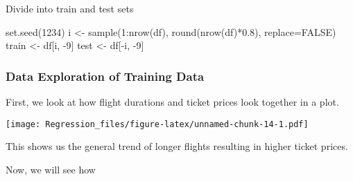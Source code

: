 \documentclass[
]{article}
\newenvironment{Shaded}{\begin{snugshade}}{\end{snugshade}}
\newcommand{\AttributeTok}[1]{\textcolor[rgb]{0.77,0.63,0.00}{#1}}
\newcommand{\ConstantTok}[1]{\textcolor[rgb]{0.00,0.00,0.00}{#1}}
\newcommand{\DecValTok}[1]{\textcolor[rgb]{0.00,0.00,0.81}{#1}}
\newcommand{\FloatTok}[1]{\textcolor[rgb]{0.00,0.00,0.81}{#1}}
\newcommand{\FunctionTok}[1]{\textcolor[rgb]{0.00,0.00,0.00}{#1}}
\newcommand{\NormalTok}[1]{#1}
\newcommand{\OtherTok}[1]{\textcolor[rgb]{0.56,0.35,0.01}{#1}}
\newcommand{\SpecialCharTok}[1]{\textcolor[rgb]{0.00,0.00,0.00}{#1}}
\newcommand{\StringTok}[1]{\textcolor[rgb]{0.31,0.60,0.02}{#1}}
\begin{document}
Divide into train and test sets

\begin{Shaded}
\begin{Highlighting}[]
\FunctionTok{set.seed}\NormalTok{(}\DecValTok{1234}\NormalTok{)}
\NormalTok{i }\OtherTok{\textless{}{-}} \FunctionTok{sample}\NormalTok{(}\DecValTok{1}\SpecialCharTok{:}\FunctionTok{nrow}\NormalTok{(df), }\FunctionTok{round}\NormalTok{(}\FunctionTok{nrow}\NormalTok{(df)}\SpecialCharTok{*}\FloatTok{0.8}\NormalTok{), }\AttributeTok{replace=}\ConstantTok{FALSE}\NormalTok{)}
\NormalTok{train }\OtherTok{\textless{}{-}}\NormalTok{ df[i, }\SpecialCharTok{{-}}\DecValTok{9}\NormalTok{]}
\NormalTok{test }\OtherTok{\textless{}{-}}\NormalTok{ df[}\SpecialCharTok{{-}}\NormalTok{i, }\SpecialCharTok{{-}}\DecValTok{9}\NormalTok{]}
\end{Highlighting}
\end{Shaded}

\hypertarget{data-exploration-of-training-data}{%
\subsubsection{Data Exploration of Training
Data}\label{data-exploration-of-training-data}}

First, we look at how flight durations and ticket prices look together
in a plot.

\begin{Shaded}
\end{Shaded}

\texttt{[image: Regression\_files/figure-latex/unnamed-chunk-14-1.pdf]}

This shows us the general trend of longer flights resulting in higher
ticket prices.

Now, we will see how
\end{document}
